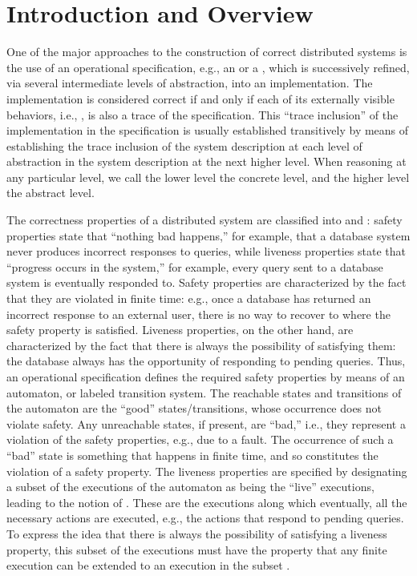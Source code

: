 \documentclass[11pt]{article}
\begin{document}
\section{Introduction and Overview}

One of the major approaches to the construction of correct distributed
systems is the use of an operational specification, e.g., an 
or a , which is successively refined, via
several intermediate levels of abstraction, into an
implementation. The implementation is considered correct if and only if each of
its externally visible behaviors, i.e., , is also a trace of the
specification. 
This ``trace inclusion'' of the implementation in the specification is
usually established transitively by means of establishing the trace
inclusion of the system description at each level of abstraction in
the system description at the next higher level.  When reasoning at
any particular level, we call the lower level the concrete level, and
the higher level the abstract level.

The correctness properties of a distributed system are classified into
 and  \cite{Lam77}: 
safety properties state that ``nothing bad happens,'' for example,
that a database system never produces incorrect responses to queries, 
while
liveness properties state that ``progress occurs in the system,'' for
example, every query sent to a database system is eventually responded to.
Safety properties are characterized by the fact that they are violated
in finite time: e.g., once a database has returned an incorrect
response to an external user, there is no way to recover to where the
safety property is satisfied. Liveness properties, on the other
hand, are characterized by the fact that there is always the
possibility of satisfying them: the database always has the
opportunity of responding to pending queries.
Thus, an operational specification defines the required safety properties by
means of an automaton, or labeled transition system. The reachable
states and transitions of the automaton are the ``good''
states/transitions, whose occurrence does not violate safety. Any
unreachable states, if present, are ``bad,'' i.e., they represent a
violation of the safety properties, e.g., due to a fault.
The occurrence of such a ``bad'' state is something that happens in
finite time, and so constitutes the violation of a safety property.
The liveness properties are specified by designating a subset of the
executions of the automaton as being the ``live'' executions, leading
to the notion of .
These are the executions along which eventually, all the necessary
actions are executed, e.g., the actions that respond to pending queries.
To express the idea that there is always the possibility of
satisfying a liveness property, this subset of the executions must have the property
that any finite execution can be extended to an execution in the
subset \cite{AL91}. 
\end{document}
